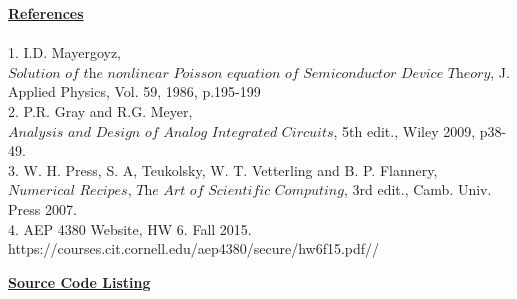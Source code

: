 \documentclass[11pt,letterpaper]{article}
\begin{document}
\underline{\bf \large References}
\\
\\
1.	I.D. Mayergoyz, $\textit{Solution of the nonlinear Poisson equation of Semiconductor Device Theory}$, J. Applied Physics, Vol. 59, 1986, p.195-199\\
2.	P.R. Gray and R.G. Meyer, $\textit{Analysis and Design of Analog Integrated Circuits}$, 5th edit., Wiley 2009, p38-49.
\\
3.	W. H. Press, S. A, Teukolsky, W. T. Vetterling and B. P. Flannery, \\$\textit{Numerical Recipes, The Art of Scientific Computing}$, 3rd edit., Camb. Univ. Press 2007.
\\
4.	AEP 4380 Website, HW 6. Fall 2015. https://courses.cit.cornell.edu/aep4380/secure/hw6f15.pdf//


\newpage
\begin{center}
\underline{\bf \large Source Code Listing}
\end{center}
\end{document}
